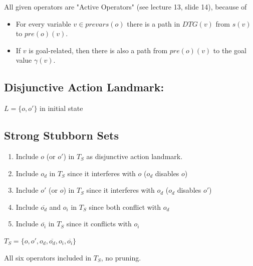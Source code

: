 \documentclass[11pt,a4paper]{article}
\begin{document}
All given operators are "Active Operators" (see lecture 13, slide 14), because of
\begin{itemize}
\item For every variable $v \in prevars(o)$ there is a path in $DTG(v)$ from $s(v)$ to $pre(o)(v)$.
\item If $v$ is goal-related, then there is also a path from $pre(o)(v)$ to the goal value $\gamma(v)$.
\end{itemize}

\subsection*{Disjunctive Action Landmark:}
$ L=\{o, o'\} $ in initial state

\subsection*{Strong Stubborn Sets}
\begin{enumerate}
\item Include $o$ (or $o'$) in $T_S$ as disjunctive action landmark.
\item Include $o_d$ in $T_S$ since it interferes with $o$ ($o_d$ disables $o$)
\item Include $o'$ (or $o$) in $T_S$ since it interferes with $o_d$ ($o_d$ disables $o'$)
\item Include $\overline{o_d}$ and $o_i$ in $T_S$ since both conflict with $o_d$
\item Include $\overline{o_i}$ in $T_S$ since it conflicts with $o_i$
\end{enumerate}
$T_S = \{o, o', o_d, \overline{o_d}, o_i, \overline{o_i}\} $

All six operators included in $T_S$, no pruning.
\end{document}
